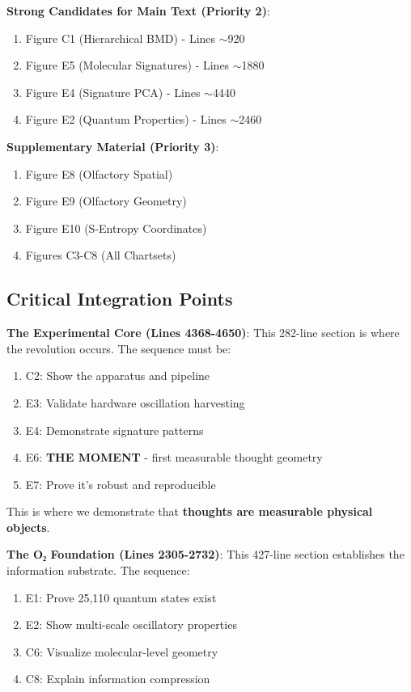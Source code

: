 \documentclass[11pt]{article}
\begin{document}
\textbf{Strong Candidates for Main Text (Priority 2)}:
\begin{enumerate}
\item Figure C1 (Hierarchical BMD) - Lines $\sim$920
\item Figure E5 (Molecular Signatures) - Lines $\sim$1880
\item Figure E4 (Signature PCA) - Lines $\sim$4440
\item Figure E2 (Quantum Properties) - Lines $\sim$2460
\end{enumerate}

\textbf{Supplementary Material (Priority 3)}:
\begin{enumerate}
\item Figure E8 (Olfactory Spatial)
\item Figure E9 (Olfactory Geometry)
\item Figure E10 (S-Entropy Coordinates)
\item Figures C3-C8 (All Chartsets)
\end{enumerate}

\subsection{Critical Integration Points}

\textbf{The Experimental Core (Lines 4368-4650)}:
This 282-line section is where the revolution occurs. The sequence must be:
\begin{enumerate}
\item C2: Show the apparatus and pipeline
\item E3: Validate hardware oscillation harvesting
\item E4: Demonstrate signature patterns
\item E6: \textbf{THE MOMENT} - first measurable thought geometry
\item E7: Prove it's robust and reproducible
\end{enumerate}

This is where we demonstrate that \textbf{thoughts are measurable physical objects}.

\textbf{The O₂ Foundation (Lines 2305-2732)}:
This 427-line section establishes the information substrate. The sequence:
\begin{enumerate}
\item E1: Prove 25,110 quantum states exist
\item E2: Show multi-scale oscillatory properties
\item C6: Visualize molecular-level geometry
\item C8: Explain information compression
\end{enumerate}
\end{document}
